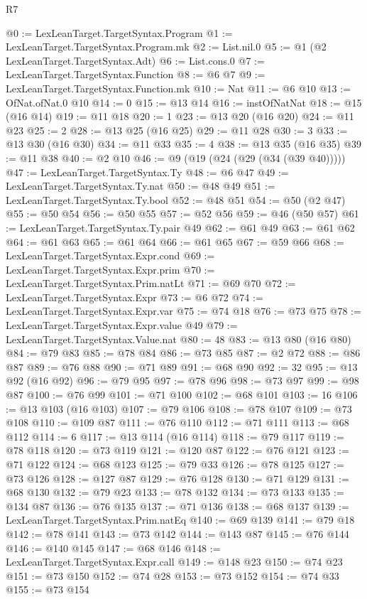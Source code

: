 \begin{lexlean}{R7}
\begin{coremodule}
@0 := LexLeanTarget.TargetSyntax.Program
@1 := LexLeanTarget.TargetSyntax.Program.mk
@2 := List.nil.{0}
@5 := @1 (@2 LexLeanTarget.TargetSyntax.Adt)
@6 := List.cons.{0}
@7 := LexLeanTarget.TargetSyntax.Function
@8 := @6 @7
@9 := LexLeanTarget.TargetSyntax.Function.mk
@10 := Nat
@11 := @6 @10
@13 := OfNat.ofNat.{0} @10
@14 := 0
@15 := @13 @14
@16 := instOfNatNat
@18 := @15 (@16 @14)
@19 := @11 @18
@20 := 1
@23 := @13 @20 (@16 @20)
@24 := @11 @23
@25 := 2
@28 := @13 @25 (@16 @25)
@29 := @11 @28
@30 := 3
@33 := @13 @30 (@16 @30)
@34 := @11 @33
@35 := 4
@38 := @13 @35 (@16 @35)
@39 := @11 @38
@40 := @2 @10
@46 := @9 (@19 (@24 (@29 (@34 (@39 @40)))))
@47 := LexLeanTarget.TargetSyntax.Ty
@48 := @6 @47
@49 := LexLeanTarget.TargetSyntax.Ty.nat
@50 := @48 @49
@51 := LexLeanTarget.TargetSyntax.Ty.bool
@52 := @48 @51
@54 := @50 (@2 @47)
@55 := @50 @54
@56 := @50 @55
@57 := @52 @56
@59 := @46 (@50 @57)
@61 := LexLeanTarget.TargetSyntax.Ty.pair @49
@62 := @61 @49
@63 := @61 @62
@64 := @61 @63
@65 := @61 @64
@66 := @61 @65
@67 := @59 @66
@68 := LexLeanTarget.TargetSyntax.Expr.cond
@69 := LexLeanTarget.TargetSyntax.Expr.prim
@70 := LexLeanTarget.TargetSyntax.Prim.natLt
@71 := @69 @70
@72 := LexLeanTarget.TargetSyntax.Expr
@73 := @6 @72
@74 := LexLeanTarget.TargetSyntax.Expr.var
@75 := @74 @18
@76 := @73 @75
@78 := LexLeanTarget.TargetSyntax.Expr.value @49
@79 := LexLeanTarget.TargetSyntax.Value.nat
@80 := 48
@83 := @13 @80 (@16 @80)
@84 := @79 @83
@85 := @78 @84
@86 := @73 @85
@87 := @2 @72
@88 := @86 @87
@89 := @76 @88
@90 := @71 @89
@91 := @68 @90
@92 := 32
@95 := @13 @92 (@16 @92)
@96 := @79 @95
@97 := @78 @96
@98 := @73 @97
@99 := @98 @87
@100 := @76 @99
@101 := @71 @100
@102 := @68 @101
@103 := 16
@106 := @13 @103 (@16 @103)
@107 := @79 @106
@108 := @78 @107
@109 := @73 @108
@110 := @109 @87
@111 := @76 @110
@112 := @71 @111
@113 := @68 @112
@114 := 6
@117 := @13 @114 (@16 @114)
@118 := @79 @117
@119 := @78 @118
@120 := @73 @119
@121 := @120 @87
@122 := @76 @121
@123 := @71 @122
@124 := @68 @123
@125 := @79 @33
@126 := @78 @125
@127 := @73 @126
@128 := @127 @87
@129 := @76 @128
@130 := @71 @129
@131 := @68 @130
@132 := @79 @23
@133 := @78 @132
@134 := @73 @133
@135 := @134 @87
@136 := @76 @135
@137 := @71 @136
@138 := @68 @137
@139 := LexLeanTarget.TargetSyntax.Prim.natEq
@140 := @69 @139
@141 := @79 @18
@142 := @78 @141
@143 := @73 @142
@144 := @143 @87
@145 := @76 @144
@146 := @140 @145
@147 := @68 @146
@148 := LexLeanTarget.TargetSyntax.Expr.call
@149 := @148 @23
@150 := @74 @23
@151 := @73 @150
@152 := @74 @28
@153 := @73 @152
@154 := @74 @33
@155 := @73 @154

\end{coremodule}
\end{lexlean}
